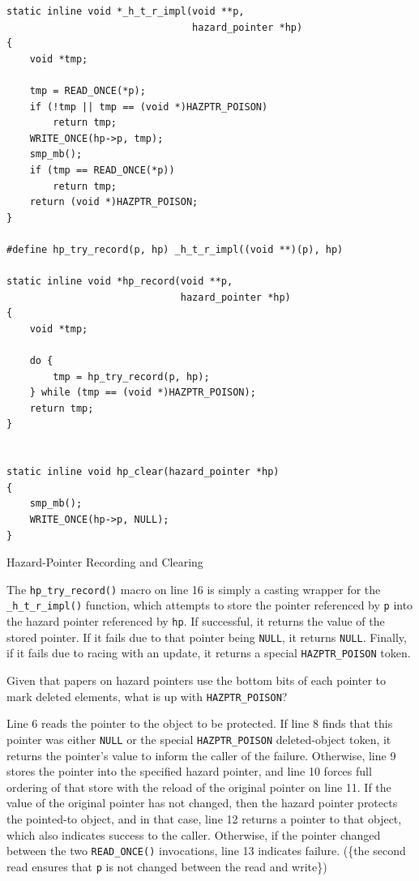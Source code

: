 \documentclass[11pt]{article}
\begin{document}
\begin{listing}[htbp]
\begin{verbatim}
static inline void *_h_t_r_impl(void **p,
                                hazard_pointer *hp)
{
    void *tmp;

    tmp = READ_ONCE(*p);
    if (!tmp || tmp == (void *)HAZPTR_POISON)
        return tmp;
    WRITE_ONCE(hp->p, tmp);
    smp_mb();
    if (tmp == READ_ONCE(*p))
        return tmp;
    return (void *)HAZPTR_POISON;
}

#define hp_try_record(p, hp) _h_t_r_impl((void **)(p), hp)

static inline void *hp_record(void **p,
                              hazard_pointer *hp)
{
    void *tmp;

    do {
        tmp = hp_try_record(p, hp);
    } while (tmp == (void *)HAZPTR_POISON);
    return tmp;
}


static inline void hp_clear(hazard_pointer *hp)
{
    smp_mb();
    WRITE_ONCE(hp->p, NULL);
}
\end{verbatim}
\caption{\label{l9.4}Hazard-Pointer Recording and Clearing}
\end{listing}

The \texttt{hp\_try\_record()} macro on line 16 is simply a casting wrapper for the \texttt{\_h\_t\_r\_impl()} function, which
attempts to store the pointer referenced by \texttt{p} into the hazard pointer referenced by \texttt{hp}. If successful,
it returns the value of the stored pointer. If it fails due to that pointer being \texttt{NULL}, it returns
\texttt{NULL}. Finally, if it fails due to racing with an update, it returns a special \texttt{HAZPTR\_POISON} token.

\begin{remark}[]
Given that papers on hazard pointers use the bottom bits of each pointer to mark deleted elements,
what is up with \texttt{HAZPTR\_POISON}?
\end{remark}

Line 6 reads the pointer to the object to be protected. If line 8 finds that this pointer was either
\texttt{NULL} or the special \texttt{HAZPTR\_POISON} deleted-object token, it returns the pointer’s value to inform the
caller of the failure. Otherwise, line 9 stores the pointer into the specified hazard pointer, and
line 10 forces full ordering of that store with the reload of the original pointer on line 11. If the
value of the original pointer has not changed, then the hazard pointer protects the pointed-to object,
and in that case, line 12 returns a pointer to that object, which also indicates success to the
caller. Otherwise, if the pointer changed between the two \texttt{READ\_ONCE()} invocations, line 13 indicates
failure. (\wu\{the second read ensures that \texttt{p} is not changed between the read and write\})
\end{document}
